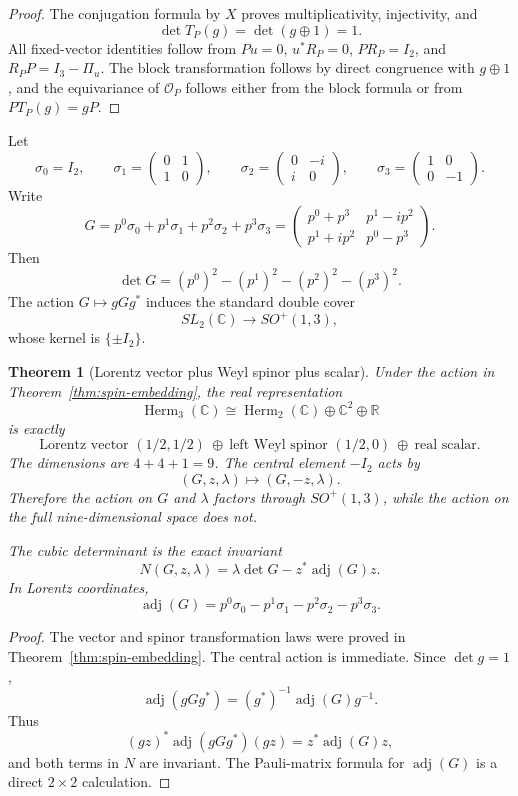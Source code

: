 \documentclass[11pt]{article}
\newtheorem{theorem}{Theorem}[section]
\theoremstyle{definition}
\newcommand{\C}{\mathbb C}
\newcommand{\R}{\mathbb R}
\newcommand{\Herm}{\operatorname{Herm}}
\newcommand{\adj}{\operatorname{adj}}
\begin{document}
\begin{proof}
The conjugation formula by $X$ proves multiplicativity, injectivity, and
\[
 \det T_P(g)=\det(g\oplus1)=1.
\]
All fixed-vector identities follow from $Pu=0$, $u^*R_P=0$, $PR_P=I_2$, and $R_PP=I_3-\Pi_u$.  The block transformation follows by direct congruence with $g\oplus1$, and the equivariance of $\mathcal O_P$ follows either from the block formula or from $PT_P(g)=gP$.
\end{proof}

Let
\[
 \sigma_0=I_2,\qquad
 \sigma_1=\begin{pmatrix}0&1\\1&0\end{pmatrix},\qquad
 \sigma_2=\begin{pmatrix}0&-i\\i&0\end{pmatrix},\qquad
 \sigma_3=\begin{pmatrix}1&0\\0&-1\end{pmatrix}.
\]
Write
\[
 G=p^0\sigma_0+p^1\sigma_1+p^2\sigma_2+p^3\sigma_3
 =\begin{pmatrix}
 p^0+p^3&p^1-ip^2\\p^1+ip^2&p^0-p^3
 \end{pmatrix}.
\]
Then
\[
 \det G=(p^0)^2-(p^1)^2-(p^2)^2-(p^3)^2.
\]
The action $G\mapsto gGg^*$ induces the standard double cover
\[
 SL_2(\C)\longrightarrow SO^+(1,3),
\]
whose kernel is $\{\pm I_2\}$.

\begin{theorem}[Lorentz vector plus Weyl spinor plus scalar]\label{thm:941}
Under the action in Theorem~\ref{thm:spin-embedding}, the real representation
\[
 \Herm_3(\C)
 \cong\Herm_2(\C)\oplus\C^2\oplus\R
\]
is exactly
\[
 \boxed{
 \text{Lorentz vector }(1/2,1/2)
 \ \oplus\ 
 \text{left Weyl spinor }(1/2,0)
 \ \oplus\ 
 \text{real scalar}.}
\]
The dimensions are $4+4+1=9$.  The central element $-I_2$ acts by
\[
 (G,z,\lambda)\longmapsto(G,-z,\lambda).
\]
Therefore the action on $G$ and $\lambda$ factors through $SO^+(1,3)$, while the action on the full nine-dimensional space does not.

The cubic determinant is the exact invariant
\[
 \boxed{
 N(G,z,\lambda)
 =\lambda\det G-z^*\adj(G)z.}
\]
In Lorentz coordinates,
\[
 \adj(G)=p^0\sigma_0-p^1\sigma_1-p^2\sigma_2-p^3\sigma_3.
\]
\end{theorem}

\begin{proof}
The vector and spinor transformation laws were proved in Theorem~\ref{thm:spin-embedding}.  The central action is immediate.  Since $\det g=1$,
\[
 \adj(gGg^*)=(g^*)^{-1}\adj(G)g^{-1}.
\]
Thus
\[
 (gz)^*\adj(gGg^*)(gz)=z^*\adj(G)z,
\]
and both terms in $N$ are invariant.  The Pauli-matrix formula for $\adj(G)$ is a direct $2\times2$ calculation.
\end{proof}
\end{document}
